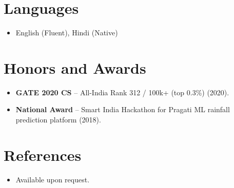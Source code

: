\documentclass[11pt,a4paper,sans]{moderncv}
\begin{document}

\section{Languages}
\vspace{1pt}
\begin{itemize}
\item English (Fluent), Hindi (Native)
\end{itemize}


\section{Honors and Awards}
\vspace{1pt}
\begin{itemize}
\item \textbf{GATE 2020 CS} -- All-India Rank 312 / 100k+ (top 0.3\%) (2020).
\item \textbf{National Award} -- Smart India Hackathon for Pragati ML rainfall prediction platform (2018).
\end{itemize}


\section{References}
\vspace{1pt}
\begin{itemize}
\item Available upon request.
\end{itemize}
\end{document}
